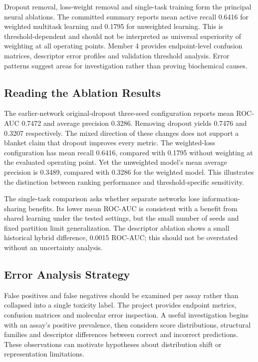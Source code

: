 \documentclass[conference]{IEEEtran}
\begin{document}
Dropout removal, loss-weight removal and single-task training form the principal neural ablations. The committed summary reports mean active recall 0.6416 for weighted multitask learning and 0.1795 for unweighted learning. This is threshold-dependent and should not be interpreted as universal superiority of weighting at all operating points. Member 4 provides endpoint-level confusion matrices, descriptor error profiles and validation threshold analysis. Error patterns suggest areas for investigation rather than proving biochemical causes.


\subsection{Reading the Ablation Results}
The earlier-network original-dropout three-seed configuration reports mean ROC-AUC 0.7472 and average precision 0.3286. Removing dropout yields 0.7476 and 0.3207 respectively. The mixed direction of these changes does not support a blanket claim that dropout improves every metric. The weighted-loss configuration has mean recall 0.6416, compared with 0.1795 without weighting at the evaluated operating point. Yet the unweighted model's mean average precision is 0.3489, compared with 0.3286 for the weighted model. This illustrates the distinction between ranking performance and threshold-specific sensitivity.

The single-task comparison asks whether separate networks lose information-sharing benefits. Its lower mean ROC-AUC is consistent with a benefit from shared learning under the tested settings, but the small number of seeds and fixed partition limit generalization. The descriptor ablation shows a small historical hybrid difference, 0.0015 ROC-AUC; this should not be overstated without an uncertainty analysis.

\subsection{Error Analysis Strategy}
False positives and false negatives should be examined per assay rather than collapsed into a single toxicity label. The project provides endpoint metrics, confusion matrices and molecular error inspection. A useful investigation begins with an assay's positive prevalence, then considers score distributions, structural families and descriptor differences between correct and incorrect predictions. These observations can motivate hypotheses about distribution shift or representation limitations.
\end{document}
